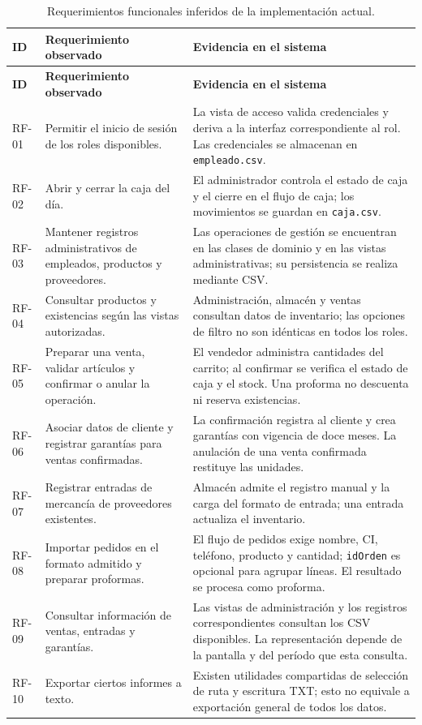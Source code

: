 \begin{longtable}{|p{1.15cm}|p{4.35cm}|p{7.1cm}|}
\caption{Requerimientos funcionales inferidos de la implementación actual.}
\label{tab:requerimientos-funcionales}\\
\hline
\textbf{ID} & \textbf{Requerimiento observado} & \textbf{Evidencia en el sistema}\\
\hline
\endfirsthead
\hline
\textbf{ID} & \textbf{Requerimiento observado} & \textbf{Evidencia en el sistema}\\
\hline
\endhead
RF-01 & Permitir el inicio de sesión de los roles disponibles. & La vista de acceso valida credenciales y deriva a la interfaz correspondiente al rol. Las credenciales se almacenan en \texttt{empleado.csv}.\\
\hline
RF-02 & Abrir y cerrar la caja del día. & El administrador controla el estado de caja y el cierre en el flujo de caja; los movimientos se guardan en \texttt{caja.csv}.\\
\hline
RF-03 & Mantener registros administrativos de empleados, productos y proveedores. & Las operaciones de gestión se encuentran en las clases de dominio y en las vistas administrativas; su persistencia se realiza mediante CSV.\\
\hline
RF-04 & Consultar productos y existencias según las vistas autorizadas. & Administración, almacén y ventas consultan datos de inventario; las opciones de filtro no son idénticas en todos los roles.\\
\hline
RF-05 & Preparar una venta, validar artículos y confirmar o anular la operación. & El vendedor administra cantidades del carrito; al confirmar se verifica el estado de caja y el stock. Una proforma no descuenta ni reserva existencias.\\
\hline
RF-06 & Asociar datos de cliente y registrar garantías para ventas confirmadas. & La confirmación registra al cliente y crea garantías con vigencia de doce meses. La anulación de una venta confirmada restituye las unidades.\\
\hline
RF-07 & Registrar entradas de mercancía de proveedores existentes. & Almacén admite el registro manual y la carga del formato de entrada; una entrada actualiza el inventario.\\
\hline
RF-08 & Importar pedidos en el formato admitido y preparar proformas. & El flujo de pedidos exige nombre, CI, teléfono, producto y cantidad; \texttt{idOrden} es opcional para agrupar líneas. El resultado se procesa como proforma.\\
\hline
RF-09 & Consultar información de ventas, entradas y garantías. & Las vistas de administración y los registros correspondientes consultan los CSV disponibles. La representación depende de la pantalla y del período que esta consulta.\\
\hline
RF-10 & Exportar ciertos informes a texto. & Existen utilidades compartidas de selección de ruta y escritura TXT; esto no equivale a exportación general de todos los datos.\\
\hline
\end{longtable}

